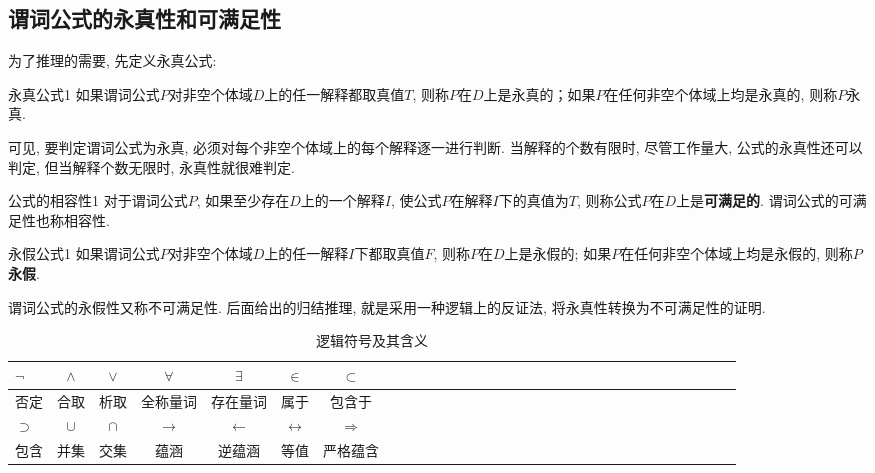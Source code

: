 \subsection{谓词公式的永真性和可满足性}
    为了推理的需要, 先定义永真公式:
\begin{mydef}{永真公式}{1}
    如果谓词公式$P$对非空个体域$D$上的任一解释都取真值$T$, 则称$P$在$D$上是永真的；如果$P$在任何非空个体域上均是永真的, 则称$P$永真.
\end{mydef}

可见, 要判定谓词公式为永真, 必须对每个非空个体域上的每个解释逐一进行判断. 当解释的个数有限时, 尽管工作量大, 公式的永真性还可以判定, 但当解释个数无限时, 永真性就很难判定.
\begin{mydef}{公式的相容性}{1}
对于谓词公式$P$, 如果至少存在$D$上的一个解释$I$, 使公式$P$在解释$I$下的真值为$T$, 则称公式$P$在$D$上是\textbf{可满足的}.
谓词公式的可满足性也称相容性.
\end{mydef}
\begin{mydef}{永假公式}{1}
    如果谓词公式$P$对非空个体域$D$上的任一解释$I$下都取真值$F$, 则称$P$在$D$上是永假的; 如果$P$在任何非空个体域上均是永假的, 则称\textbf{$P$永假}.
\end{mydef}
\begin{remark}
  谓词公式的永假性又称不可满足性. 后面给出的归结推理, 就是采用一种逻辑上的反证法, 将永真性转换为不可满足性的证明.
\end{remark}
\begin{table}[H]
\caption{逻辑符号及其含义}
\vspace{-0.3cm}
\begin{center}
\begin{tabular} {lccccccccccccccccccccccccccccccc}
\hline
$\neg$&$\wedge$&$\vee$&$\forall$&$\exists$&$\in$&$\subset$\\
\hline
否定	&合取&析取&全称量词&存在量词&属于&包含于\\
\hline
$\supset$&$\cup$&$\cap$&$\rightarrow$&$\leftarrow$&$\leftrightarrow$&$\Rightarrow$\\
\hline
包含&并集&交集&蕴涵&逆蕴涵&等值&严格蕴含\\
\hline
\end{tabular}
\end{center}
\label{AItable202020020101}
\end{table}
